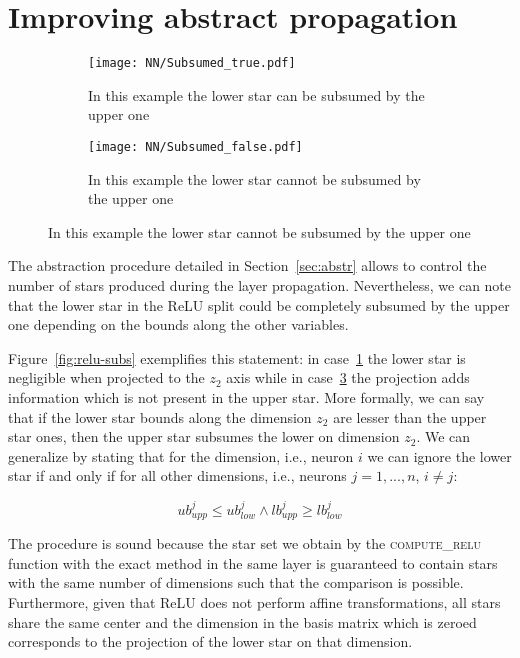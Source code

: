 \section{Improving abstract propagation}
\label{sec:optim}

\begin{figure}[t]
	\centering
	\caption{\label{fig:relu-subs} ReLU split subsumption example along axis $z_1$
		(the actual lower star is collapsed to a line)}
	\begin{subfigure}{.45\textwidth}
		\texttt{[image: NN/Subsumed\_true.pdf]}
		\caption{\label{fig:relu-subs-ok}In this example the lower star can be
			subsumed by the upper one}
	\end{subfigure}
	\hspace*{\fill}
	\begin{subfigure}{.45\textwidth}
		\texttt{[image: NN/Subsumed\_false.pdf]}
		\caption{\label{fig:relu-subs-no}In this example the lower star cannot be 
			subsumed by the upper one}
	\end{subfigure}
\end{figure}

The abstraction procedure detailed in Section~\ref{sec:abstr} allows to control the
number of stars produced during the layer propagation. Nevertheless, we can note that
the lower star in the ReLU split could be completely subsumed by the upper one depending
on the bounds along the other variables. 

Figure~\ref{fig:relu-subs} exemplifies this statement: in case~\ref{fig:relu-subs-ok}
the lower star is negligible when projected to the $z_2$ axis while in case~\ref{fig:relu-subs-no}
the projection adds information which is not present in the upper star. More formally,
we can say that if the lower star bounds along the dimension $z_2$ are lesser than the upper
star ones, then the upper star subsumes the lower on dimension $z_2$. We can generalize by
stating that for the dimension, i.e., neuron $i$ we can ignore the lower star if and only if
for all other dimensions, i.e., neurons $j = 1, ..., n$, $i \neq j$:

$$ub^j_{upp} \leq ub^j_{low} \wedge lb^j_{upp} \geq lb^j_{low}$$

The procedure is sound because the star set we obtain by the \textsc{compute\_relu} function
with the exact method in the same layer is guaranteed to contain stars with the same number
of dimensions such that the comparison is possible. Furthermore, given that ReLU does not
perform affine transformations, all stars share the same center and the dimension in the basis
matrix which is zeroed corresponds to the projection of the lower star on that dimension.

